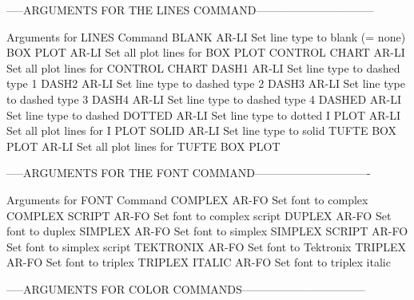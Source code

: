 -----ARGUMENTS FOR THE LINES COMMAND--------------------------------

Arguments for LINES Command
BLANK                       AR-LI Set line type to blank (= none)
BOX PLOT                    AR-LI Set all plot lines for BOX PLOT
CONTROL CHART               AR-LI Set all plot lines for CONTROL CHART
DASH1                       AR-LI Set line type to dashed type 1
DASH2                       AR-LI Set line type to dashed type 2
DASH3                       AR-LI Set line type to dashed type 3
DASH4                       AR-LI Set line type to dashed type 4
DASHED                      AR-LI Set line type to dashed
DOTTED                      AR-LI Set line type to dotted
I PLOT                      AR-LI Set all plot lines for I PLOT
SOLID                       AR-LI Set line type to solid
TUFTE BOX PLOT              AR-LI Set all plot lines for TUFTE BOX PLOT

-----ARGUMENTS FOR THE FONT COMMAND-------------------------------

Arguments for FONT Command
COMPLEX                     AR-FO Set font to complex
COMPLEX SCRIPT              AR-FO Set font to complex script
DUPLEX                      AR-FO Set font to duplex
SIMPLEX                     AR-FO Set font to simplex
SIMPLEX SCRIPT              AR-FO Set font to simplex script
TEKTRONIX                   AR-FO Set font to Tektronix
TRIPLEX                     AR-FO Set font to triplex
TRIPLEX ITALIC              AR-FO Set font to triplex italic

-----ARGUMENTS FOR COLOR COMMANDS---------------------------------

